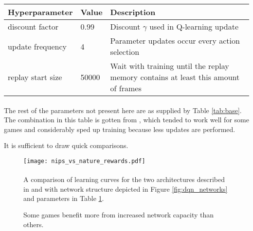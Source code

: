 \begin{table}
  \label{tab:boost}
  \renewcommand{\arraystretch}{1.3}
\begin{tabularx}{1.\linewidth}{ll X}
Hyperparameter                  & Value             & Description                                                                                              \\
  \hline
discount factor                 & 0.99              & Discount $\gamma$ used in Q-learning update                                                              \\
update frequency                & 4                 & Parameter updates occur every action selection                                                           \\
replay start size               & 50000               & Wait with training until the replay memory contains at least this amount of frames                       \\

\end{tabularx}

\paragraph{}
\small
The rest of the parameters not present here are as supplied by Table \ref{tab:base}.
The combination in this table is gotten from \cite{Mnih2015},
which tended to work well for some games and considerably sped up training
because less updates are performed.

It is sufficient to draw quick comparisons.

\end{table}

\begin{figure}[htpb]
  \centering
  \texttt{[image: nips\_vs\_nature\_rewards.pdf]}
  \raggedright
  \paragraph{}
    A comparison of learning curves for the two architectures described in
    \cite{Mnih2013} and \cite{Mnih2015}
    with network structure depicted in Figure \ref{fig:dqn_networks}
    and parameters in Table \ref{tab:boost}.

    Some games benefit more from increased network capacity than others.
  \label{fig:nips_vs_nature_rewards}
\end{figure}

